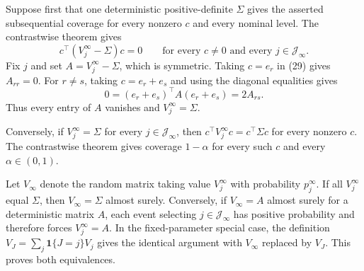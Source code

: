Suppose first that one deterministic positive-definite \(\Sigma\) gives the asserted subsequential coverage for every nonzero \(c\) and every nominal level. The contrastwise theorem gives
\[
 c^\top(V_j^\infty-\Sigma)c=0
 \qquad\text{for every }c\ne0\text{ and every }j\in\mathcal J_\infty.
\tag{29}
\]
Fix \(j\) and set \(A=V_j^\infty-\Sigma\), which is symmetric. Taking \(c=e_r\) in (29) gives \(A_{rr}=0\). For \(r\ne s\), taking \(c=e_r+e_s\) and using the diagonal equalities gives
\[
 0=(e_r+e_s)^\top A(e_r+e_s)=2A_{rs}.
\]
Thus every entry of \(A\) vanishes and \(V_j^\infty=\Sigma\).

Conversely, if \(V_j^\infty=\Sigma\) for every \(j\in\mathcal J_\infty\), then \(c^\top V_j^\infty c=c^\top\Sigma c\) for every nonzero \(c\). The contrastwise theorem gives coverage \(1-\alpha\) for every such \(c\) and every \(\alpha\in(0,1)\).

Let \(V_\infty\) denote the random matrix taking value \(V_j^\infty\) with probability \(p_j^\infty\). If all \(V_j^\infty\) equal \(\Sigma\), then \(V_\infty=\Sigma\) almost surely. Conversely, if \(V_\infty=A\) almost surely for a deterministic matrix \(A\), each event selecting \(j\in\mathcal J_\infty\) has positive probability and therefore forces \(V_j^\infty=A\). In the fixed-parameter special case, the definition \(V_J=\sum_j\mathbf1\{J=j\}V_j\) gives the identical argument with \(V_\infty\) replaced by \(V_J\). This proves both equivalences.